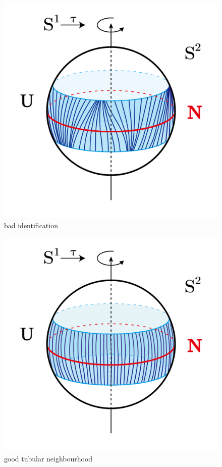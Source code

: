 \documentclass[reqno,11pt]{amsart}
\numberwithin{equation}{section}
\theoremstyle{plain}
\theoremstyle{plain}
\numberwithin{equation}{section}
\theoremstyle{remark}
\begin{document}
\begin{figure}[th]
\begin{minipage}[t]{.32\textwidth}
		\label{fig1}
	\end{minipage}
	\begin{minipage}[t]{.32\textwidth}
		\centering
		\includegraphics[width=1\textwidth]{figures/figure2-01.png}\\
		bad identification
		\label{fig2}
	\end{minipage}
	\begin{minipage}[t]{.32\textwidth}
		\centering
		\includegraphics[width=\textwidth]{figures/figure7-01.png}\\
		good tubular neighbourhood
		\label{fig3}
	\end{minipage}
\caption{}
\end{figure}
\end{document}
